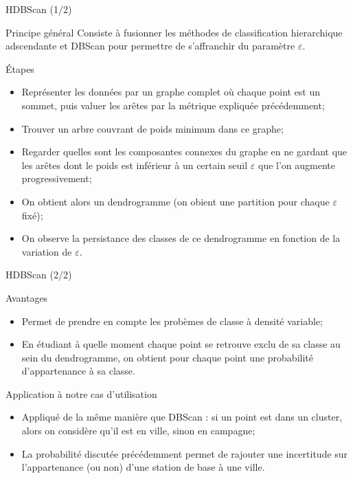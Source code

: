 \begin{frame}{HDBScan (1/2)}
    \begin{block}{Principe général}
        Consiste à fusionner les méthodes de classification hierarchique adscendante et DBScan pour permettre de s'affranchir du paramètre $\varepsilon$.
    \end{block}

    \begin{block}{Étapes}
        \begin{itemize}
            \item Représenter les données par un graphe complet où chaque point est un sommet, puis valuer les arêtes par la métrique expliquée précédemment;
            \item Trouver un arbre couvrant de poids minimum dans ce graphe;
            \item Regarder quelles sont les composantes connexes du graphe en ne gardant que les arêtes dont le poids est inférieur à un certain seuil $\varepsilon$ que l'on augmente progressivement;
            \item On obtient alors un dendrogramme (on obient une partition pour chaque $\varepsilon$ fixé);
            \item On observe la persistance des classes de ce dendrogramme en fonction de la variation de $\varepsilon$.
        \end{itemize}
    \end{block}

\end{frame}

\begin{frame}{HDBScan (2/2)}
    \begin{block}{Avantages}
        \begin{itemize}
            \item Permet de prendre en compte les probèmes de classe à densité variable;
            \item En étudiant à quelle moment chaque point se retrouve exclu de sa classe au sein du dendrogramme, on obtient pour chaque point une probabilité d'appartenance à sa classe.
        \end{itemize}
    \end{block}

    \begin{block}{Application à notre cas d'utilisation}
        \begin{itemize}
            \item Appliqué de la même manière que DBScan : si un point est dans un cluster, alors on considère qu'il est en ville, sinon en campagne;
            \item La probabilité discutée précédemment permet de rajouter une incertitude sur l'appartenance (ou non) d'une station de base à une ville.
        \end{itemize}
    \end{block}
\end{frame}

